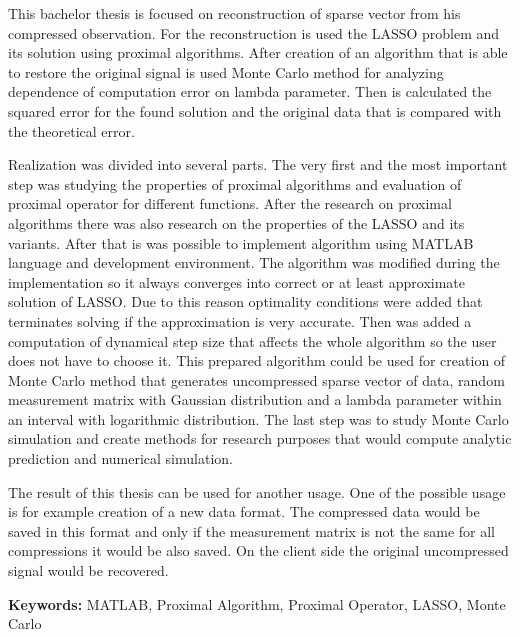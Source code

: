 \documentclass[FM,BP]{tulthesis}
\begin{document}
\begin{abstractEN}
This bachelor thesis is focused on reconstruction of sparse vector from his compressed observation. For the reconstruction is used the LASSO problem and its solution using proximal algorithms. After creation of an algorithm that is able to restore the original signal is used Monte Carlo method for analyzing dependence of computation error on lambda parameter. Then is calculated the squared error for the found solution and the original data that is compared with the theoretical error.


Realization was divided into several parts. The very first and the most important step was studying the properties of proximal algorithms and evaluation of proximal operator for different functions. After the research on proximal algorithms there was also research on the properties of the LASSO and its variants. After that is was possible to implement algorithm using MATLAB language and development environment. The algorithm was modified during the implementation so it always converges into correct or at least approximate solution of LASSO. Due to this reason optimality conditions were added that terminates solving if the approximation is very accurate. Then was added a computation of dynamical step size that affects the whole algorithm so the user does not have to choose it. This prepared algorithm could be used for creation of Monte Carlo method that generates uncompressed sparse vector of data, random measurement matrix with Gaussian distribution and a lambda parameter within an interval with logarithmic distribution. The last step was to study Monte Carlo simulation and create methods for research purposes that would compute analytic prediction and numerical simulation.


The result of this thesis can be used for another usage. One of the possible usage is for example creation of a new data format. The compressed data would be saved in this format and only if the measurement matrix is not the same for all compressions it would be also saved. On the client side the original uncompressed signal would be recovered.


\textbf{Keywords:} MATLAB, Proximal Algorithm, Proximal Operator, LASSO, Monte Carlo
\end{abstractEN}
\clearpage
\tableofcontents

\listoffigures

\newcommand{\listequationsname}{Seznam vzorců}
\newlistof{myequations}{equ}{\listequationsname}
\newcommand{\myequations}[1]{%
	\addcontentsline{equ}{myequations}{\protect\numberline{}#1}\par}
\setlength{\cftmyequationsnumwidth}{0.0em}
\listofmyequations
\end{document}
